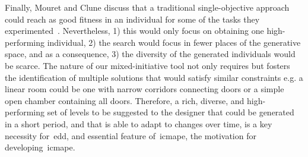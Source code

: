 









Finally, Mouret and Clune discuss that a traditional single-objective approach could reach as good fitness in an individual for some of the tasks they experimented~\cite{Mouret2015}. Nevertheless, 1) this would only focus on obtaining one high-performing individual, 2) the search would focus in fewer places of the generative space, and as a consequence, 3) the diversity of the generated individuals would be scarce. The nature of our mixed-initiative tool not only requires but fosters the identification of multiple solutions that would satisfy similar constraints e.g. a linear room could be one with narrow corridors connecting doors or a simple open chamber containing all doors. Therefore, a rich, diverse, and high-performing set of levels to be suggested to the designer that could be generated in a short period, and that is able to adapt to changes over time, is a key necessity for~\acrshort{edd}, and essential feature of~\acrshort{icmape}, the motivation for developing~\acrshort{icmape}.



